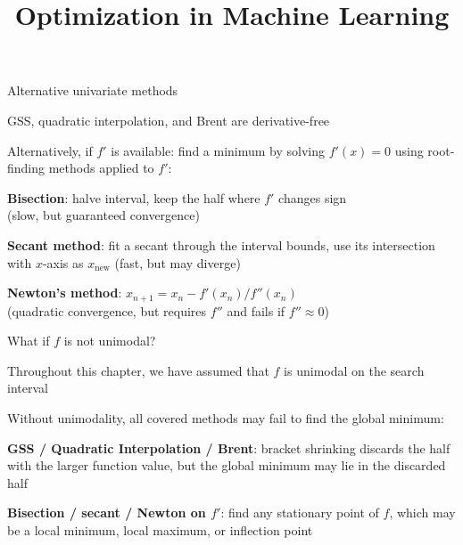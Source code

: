 \documentclass[11pt,compress,t,notes=noshow, xcolor=table]{beamer}
\title{Optimization in Machine Learning}
\begin{document}


\begin{framei}{Alternative univariate methods}
\item GSS, quadratic interpolation, and Brent are derivative-free
\item Alternatively, if $f'$ is available: find a minimum by solving $f'(x) = 0$ using root-finding methods applied to $f'$:
\begin{itemizeM}
\item \textbf{Bisection}: halve interval, keep the half where $f'$ changes sign \\
(slow, but guaranteed convergence)
\item \textbf{Secant method}: fit a secant through the interval bounds, use its intersection with $x$-axis as $x_\text{new}$
(fast, but may diverge)
\item \textbf{Newton's method}: $x_{n+1} = x_n - f'(x_n)/f''(x_n)$ \\
(quadratic convergence, but requires $f''$ and fails if $f'' \approx 0$)
\end{itemizeM}
\end{framei}


\begin{framei}[sep=L]{What if $f$ is not unimodal?}
\item Throughout this chapter, we have assumed that $f$ is unimodal on the search interval
\item Without unimodality, all covered methods may fail to find the global minimum:
\begin{itemizeM}
\item \textbf{GSS / Quadratic Interpolation / Brent}: bracket shrinking discards the half with the larger function value, but the global minimum may lie in the discarded half
\item \textbf{Bisection / secant / Newton on $f'$}: find any stationary point of $f$, which may be a local minimum, local maximum, or inflection point
\end{itemizeM}
\end{framei}
\end{document}
